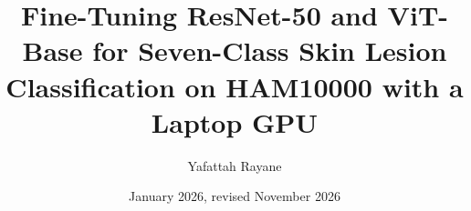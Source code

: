 \documentclass[10pt,twocolumn,letterpaper]{article}
\title{Fine-Tuning ResNet-50 and ViT-Base for Seven-Class Skin Lesion Classification on HAM10000 with a Laptop GPU}
\author{Yafattah Rayane}
\date{January 2026, revised November 2026\ifnum\smokeTest=1\\[6pt]\fbox{\textbf{SMOKE TEST: NOT REAL RESULTS}}\fi}
\begin{document}
\maketitle










\onecolumn
\appendix

\end{document}
